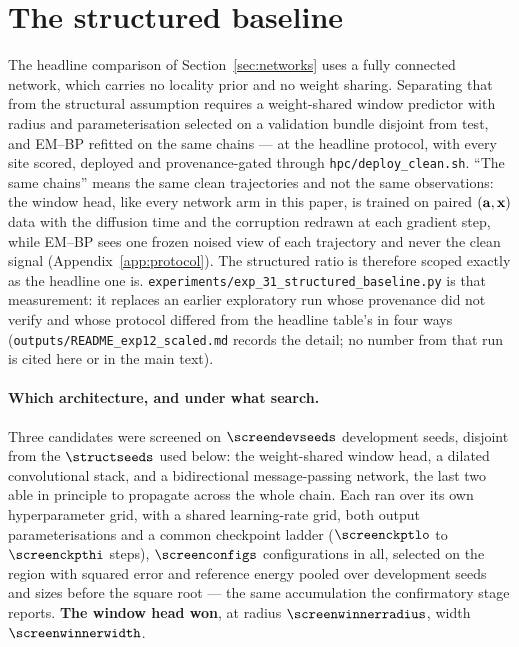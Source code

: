 \section{The structured baseline}
\label{app:structured}

The headline comparison of Section~\ref{sec:networks} uses a fully connected network, which
carries no locality prior and no weight sharing. Separating that from the structural assumption
requires a weight-shared window predictor with radius and parameterisation selected on a
validation bundle disjoint from test, and EM--BP refitted on the same chains --- at the headline
protocol, with every site scored, deployed and provenance-gated through
\texttt{hpc/deploy\_clean.sh}. ``The same chains'' means the same clean trajectories and not the
same observations: the window head, like every network arm in this paper, is trained on paired
$(\mathbf{a},\mathbf{x})$ data with the diffusion time and the corruption redrawn at each gradient step, while
EM--BP sees one frozen noised view of each trajectory and never the clean signal
(Appendix~\ref{app:protocol}). The structured ratio is therefore scoped exactly as the headline
one is. \texttt{experiments/exp\_31\_structured\_baseline.py} is that
measurement: it replaces an earlier exploratory run whose provenance did not verify and whose
protocol differed from the headline table's in four ways (\texttt{outputs/README\_exp12\_scaled.md}
records the detail; no number from that run is cited here or in the main text).

\paragraph{Which architecture, and under what search.} Three candidates were screened on
$\screendevseeds$ development seeds, disjoint from the $\structseeds$ used below: the
weight-shared window head, a dilated convolutional stack, and a bidirectional message-passing
network, the last two able in principle to propagate across the whole chain. Each ran over its own
hyperparameter grid, with a shared learning-rate grid, both output parameterisations and a common
checkpoint ladder ($\screenckptlo$ to $\screenckpthi$ steps), $\screenconfigs$ configurations in
all, selected on the \screenregion{} region with squared error and reference
energy pooled over development seeds and sizes before the square root --- the
same accumulation the confirmatory stage reports. \textbf{The window
head won}, at radius $\screenwinnerradius$, width $\screenwinnerwidth$.


